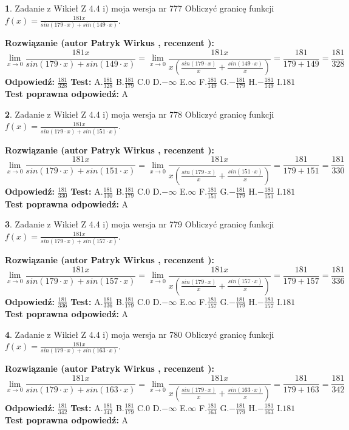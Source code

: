 \documentclass[12pt, a4paper]{article}
\theoremstyle{definition} %
\newtheorem{zad}{}
\newcommand{\zadStart}[1]{\begin{zad}#1\newline}
\newcommand{\zadStop}{\end{zad}}
\newcommand{\rozwStart}[2]{\noindent \textbf{Rozwiązanie (autor #1 , recenzent #2): }\newline}
\newcommand{\rozwStop}{\newline}
\newcommand{\odpStart}{\noindent \textbf{Odpowiedź:}\newline}
\newcommand{\odpStop}{\newline}
\newcommand{\testStart}{\noindent \textbf{Test:}\newline}
\newcommand{\testStop}{\newline}
\newcommand{\kluczStart}{\noindent \textbf{Test poprawna odpowiedź:}\newline}
\newcommand{\kluczStop}{\newline}
\begin{document}
\zadStart{Zadanie z Wikieł Z 4.4 i) moja wersja nr 777}
Obliczyć granicę funkcji $f(x)=\frac{181x}{sin(179\cdot x) +sin(149\cdot x)}$.
\zadStop
\rozwStart{Patryk Wirkus}{}
$$\lim\limits_{x\to 0}\frac{181x}{sin(179\cdot x) +sin(149\cdot x)}=\lim\limits_{x\to 0}\frac{181x}{x(\frac{sin(179\cdot x)}{x}+\frac{sin(149\cdot x)}{x})}=\frac{181}{179+149} = \frac{181}{328}$$
\rozwStop
\odpStart
$\frac{181}{328}$
\odpStop
\testStart
A.$\frac{181}{328}$
B.$\frac{181}{179}$
C.$0$
D.$-\infty$
E.$\infty$
F.$\frac{181}{149}$
G.$-\frac{181}{179}$
H.$-\frac{181}{149}$
I.$181$
\testStop
\kluczStart
A
\kluczStop



\zadStart{Zadanie z Wikieł Z 4.4 i) moja wersja nr 778}
Obliczyć granicę funkcji $f(x)=\frac{181x}{sin(179\cdot x) +sin(151\cdot x)}$.
\zadStop
\rozwStart{Patryk Wirkus}{}
$$\lim\limits_{x\to 0}\frac{181x}{sin(179\cdot x) +sin(151\cdot x)}=\lim\limits_{x\to 0}\frac{181x}{x(\frac{sin(179\cdot x)}{x}+\frac{sin(151\cdot x)}{x})}=\frac{181}{179+151} = \frac{181}{330}$$
\rozwStop
\odpStart
$\frac{181}{330}$
\odpStop
\testStart
A.$\frac{181}{330}$
B.$\frac{181}{179}$
C.$0$
D.$-\infty$
E.$\infty$
F.$\frac{181}{151}$
G.$-\frac{181}{179}$
H.$-\frac{181}{151}$
I.$181$
\testStop
\kluczStart
A
\kluczStop



\zadStart{Zadanie z Wikieł Z 4.4 i) moja wersja nr 779}
Obliczyć granicę funkcji $f(x)=\frac{181x}{sin(179\cdot x) +sin(157\cdot x)}$.
\zadStop
\rozwStart{Patryk Wirkus}{}
$$\lim\limits_{x\to 0}\frac{181x}{sin(179\cdot x) +sin(157\cdot x)}=\lim\limits_{x\to 0}\frac{181x}{x(\frac{sin(179\cdot x)}{x}+\frac{sin(157\cdot x)}{x})}=\frac{181}{179+157} = \frac{181}{336}$$
\rozwStop
\odpStart
$\frac{181}{336}$
\odpStop
\testStart
A.$\frac{181}{336}$
B.$\frac{181}{179}$
C.$0$
D.$-\infty$
E.$\infty$
F.$\frac{181}{157}$
G.$-\frac{181}{179}$
H.$-\frac{181}{157}$
I.$181$
\testStop
\kluczStart
A
\kluczStop



\zadStart{Zadanie z Wikieł Z 4.4 i) moja wersja nr 780}
Obliczyć granicę funkcji $f(x)=\frac{181x}{sin(179\cdot x) +sin(163\cdot x)}$.
\zadStop
\rozwStart{Patryk Wirkus}{}
$$\lim\limits_{x\to 0}\frac{181x}{sin(179\cdot x) +sin(163\cdot x)}=\lim\limits_{x\to 0}\frac{181x}{x(\frac{sin(179\cdot x)}{x}+\frac{sin(163\cdot x)}{x})}=\frac{181}{179+163} = \frac{181}{342}$$
\rozwStop
\odpStart
$\frac{181}{342}$
\odpStop
\testStart
A.$\frac{181}{342}$
B.$\frac{181}{179}$
C.$0$
D.$-\infty$
E.$\infty$
F.$\frac{181}{163}$
G.$-\frac{181}{179}$
H.$-\frac{181}{163}$
I.$181$
\testStop
\kluczStart
A
\kluczStop
\end{document}
